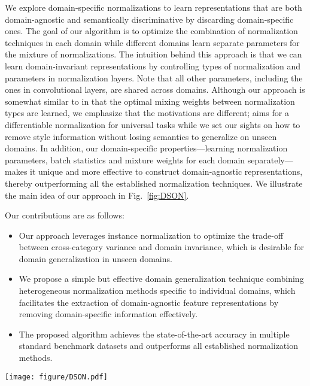 \documentclass[runningheads]{llncs}
\begin{document}
We explore domain-specific normalizations to learn representations that are both domain-agnostic and semantically discriminative by discarding domain-specific ones.
The goal of our algorithm is to optimize the combination of normalization techniques in each domain while different domains learn separate parameters for the mixture of normalizations.
The intuition behind this approach is that we can learn domain-invariant representations by controlling types of normalization and parameters in normalization layers.
Note that all other parameters, including the ones in convolutional layers, are shared across domains. 
Although our approach is somewhat similar to \cite{sn} in that the optimal mixing weights between normalization types are learned, 
we emphasize that the motivations are different; \cite{sn} aims for a differentiable normalization for universal tasks while we set our sights on how to remove style information without losing semantics to generalize on unseen domains.
In addition, our domain-specific properties---learning normalization parameters, batch statistics and mixture weights for each domain separately--- makes it unique and more effective to construct domain-agnostic representations, thereby outperforming all the established normalization techniques.
We illustrate the main idea of our approach in Fig.~\ref{fig:DSON}.


Our contributions are as follows:
\begin{itemize}
\item[] Our approach leverages instance normalization to optimize the trade-off between cross-category variance and domain invariance, which is desirable for domain generalization in unseen domains.
\item[] We propose a simple but effective domain generalization technique combining heterogeneous normalization methods specific to individual domains, which facilitates the extraction of domain-agnostic feature representations by removing domain-specific information effectively.
\item[] The proposed algorithm achieves the state-of-the-art accuracy in multiple standard benchmark datasets and outperforms all established normalization methods.
\end{itemize}


\begin{figure*}[t]
\centering
	\texttt{[image: figure/DSON.pdf]}
   \caption{Illustration of Domain Specific Optimized Normalization (DSON). Each domain maintains domain-specific batch normalization statistics and affine parameters, as well as mixture weights.
}
    \label{fig:DSON}
\end{figure*}
\end{document}
